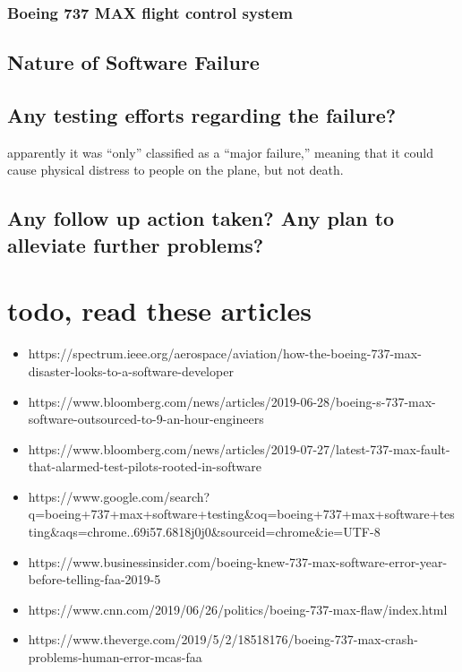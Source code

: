 \documentclass[letterpaper]{article}
\begin{document}
	\subsubsection*{Boeing 737 MAX flight control system}

	\subsection*{Nature of Software Failure}

	\subsection*{Any testing efforts regarding the failure?}
	apparently it was ``only'' classified as a “major failure,” meaning that it could cause physical distress to people on the plane, but not death. \cite{gates_2019}

	\subsection*{Any follow up action taken? Any plan to alleviate further problems?}

	\section{todo, read these articles}
	\begin{itemize}
		\item https://spectrum.ieee.org/aerospace/aviation/how-the-boeing-737-max-disaster-looks-to-a-software-developer
		\item https://www.bloomberg.com/news/articles/2019-06-28/boeing-s-737-max-software-outsourced-to-9-an-hour-engineers
		\item https://www.bloomberg.com/news/articles/2019-07-27/latest-737-max-fault-that-alarmed-test-pilots-rooted-in-software
		\item https://www.google.com/search?q=boeing+737+max+software+testing&oq=boeing+737+max+software+testing&aqs=chrome..69i57.6818j0j0&sourceid=chrome&ie=UTF-8
		\item https://www.businessinsider.com/boeing-knew-737-max-software-error-year-before-telling-faa-2019-5
		\item https://www.cnn.com/2019/06/26/politics/boeing-737-max-flaw/index.html
		\item https://www.theverge.com/2019/5/2/18518176/boeing-737-max-crash-problems-human-error-mcas-faa
	\end{itemize}
\nocite{*}
\printbibliography
\end{document}
